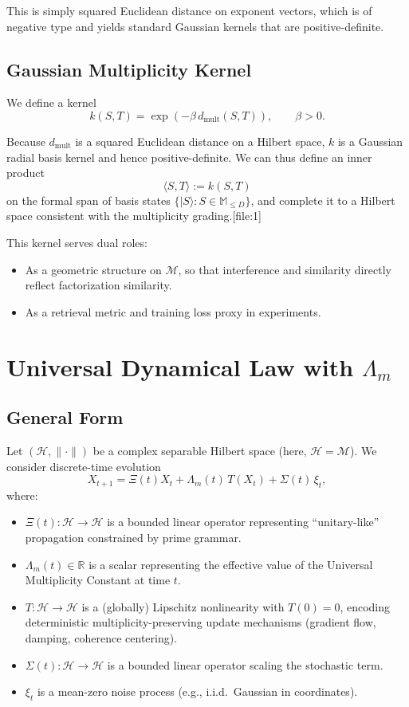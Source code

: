 \documentclass[11pt]{article}
\begin{document}
This is simply squared Euclidean distance on exponent vectors, which is of negative type and yields standard Gaussian kernels that are positive-definite.

\subsection{Gaussian Multiplicity Kernel}

We define a kernel
\[
k(S,T) = \exp(-\beta \, d_{\mathrm{mult}}(S,T)),\qquad \beta > 0.
\]

Because $d_{\mathrm{mult}}$ is a squared Euclidean distance on a Hilbert space, $k$ is a Gaussian radial basis kernel and hence positive-definite. We can thus define an inner product
\[
\langle S,T\rangle := k(S,T)
\]
on the formal span of basis states $\{|S\rangle : S\in\mathbb{M}_{\le D}\}$, and complete it to a Hilbert space consistent with the multiplicity grading.[file:1]

This kernel serves dual roles:
\begin{itemize}[leftmargin=1.5em]
\item As a geometric structure on $\mathcal{M}$, so that interference and similarity directly reflect factorization similarity.
\item As a retrieval metric and training loss proxy in experiments.
\end{itemize}

\section{Universal Dynamical Law with \texorpdfstring{$\Lambda_m$}{Λ\_m}}

\subsection{General Form}

Let $(\mathcal{H},\|\cdot\|)$ be a complex separable Hilbert space (here, $\mathcal{H} = \mathcal{M}$). We consider discrete-time evolution
\begin{equation}
X_{t+1} = \Xi(t) X_t + \Lambda_m(t)\, T(X_t) + \Sigma(t)\,\xi_t,
\label{eq:general-dynamics}
\end{equation}
where:
\begin{itemize}[leftmargin=1.5em]
\item $\Xi(t):\mathcal{H}\to\mathcal{H}$ is a bounded linear operator representing ``unitary-like'' propagation constrained by prime grammar.
\item $\Lambda_m(t)\in\mathbb{R}$ is a scalar representing the effective value of the Universal Multiplicity Constant at time $t$.
\item $T:\mathcal{H}\to\mathcal{H}$ is a (globally) Lipschitz nonlinearity with $T(0)=0$, encoding deterministic multiplicity-preserving update mechanisms (gradient flow, damping, coherence centering).
\item $\Sigma(t):\mathcal{H}\to\mathcal{H}$ is a bounded linear operator scaling the stochastic term.
\item $\xi_t$ is a mean-zero noise process (e.g., i.i.d.\ Gaussian in coordinates).
\end{itemize}
\end{document}
